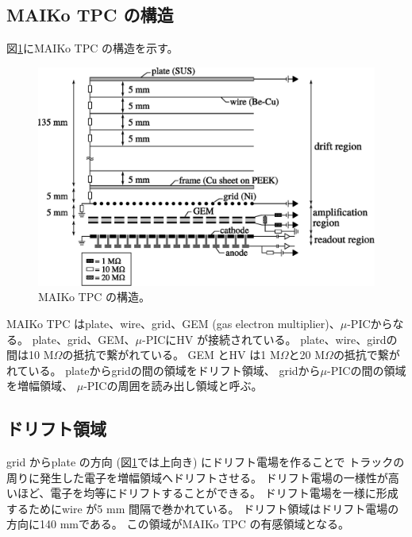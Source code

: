 \documentclass[../master]{subfiles}
\begin{document}
\subsection{MAIKo TPC の構造}
\label{sec::maiko-cage}
図\ref{fig::MAIKo_cage}にMAIKo TPC の構造を示す。
\begin{figure}
  \centering
  \includegraphics[clip, width=\columnwidth]{MAIKo_cage.eps}
  \caption{MAIKo TPC の構造。}
  \label{fig::MAIKo_cage}
\end{figure}
MAIKo TPC はplate、wire、grid、GEM (gas electron multiplier)、$\mu$-PICからなる。
plate、grid、GEM、$\mu$-PICにHV が接続されている。
plate、wire、girdの間は10 M$\Omega$の抵抗で繋がれている。
GEM とHV は1 M$\Omega$と20 M$\Omega$の抵抗で繋がれている。
plateからgridの間の領域をドリフト領域、
gridから$\mu$-PICの間の領域を増幅領域、
$\mu$-PICの周囲を読み出し領域と呼ぶ。


\subsection{ドリフト領域}
grid からplate の方向 (図\ref{fig::MAIKo_cage}では上向き) にドリフト電場を作ることで
トラックの周りに発生した電子を増幅領域へドリフトさせる。
ドリフト電場の一様性が高いほど、電子を均等にドリフトすることができる。
ドリフト電場を一様に形成するためにwire が5 mm 間隔で巻かれている。
ドリフト領域はドリフト電場の方向に140 mmである。
この領域がMAIKo TPC の有感領域となる。
\end{document}

